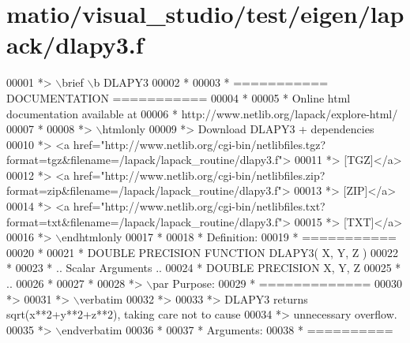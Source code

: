 \hypertarget{matio_2visual__studio_2test_2eigen_2lapack_2dlapy3_8f_source}{}\section{matio/visual\+\_\+studio/test/eigen/lapack/dlapy3.f}
\label{matio_2visual__studio_2test_2eigen_2lapack_2dlapy3_8f_source}

\begin{DoxyCode}
00001 \textcolor{comment}{*> \(\backslash\)brief \(\backslash\)b DLAPY3}
00002 \textcolor{comment}{*}
00003 \textcolor{comment}{*  =========== DOCUMENTATION ===========}
00004 \textcolor{comment}{*}
00005 \textcolor{comment}{* Online html documentation available at }
00006 \textcolor{comment}{*            http://www.netlib.org/lapack/explore-html/ }
00007 \textcolor{comment}{*}
00008 \textcolor{comment}{*> \(\backslash\)htmlonly}
00009 \textcolor{comment}{*> Download DLAPY3 + dependencies }
00010 \textcolor{comment}{*> <a
       href="http://www.netlib.org/cgi-bin/netlibfiles.tgz?format=tgz&filename=/lapack/lapack\_routine/dlapy3.f"> }
00011 \textcolor{comment}{*> [TGZ]</a> }
00012 \textcolor{comment}{*> <a
       href="http://www.netlib.org/cgi-bin/netlibfiles.zip?format=zip&filename=/lapack/lapack\_routine/dlapy3.f"> }
00013 \textcolor{comment}{*> [ZIP]</a> }
00014 \textcolor{comment}{*> <a
       href="http://www.netlib.org/cgi-bin/netlibfiles.txt?format=txt&filename=/lapack/lapack\_routine/dlapy3.f"> }
00015 \textcolor{comment}{*> [TXT]</a>}
00016 \textcolor{comment}{*> \(\backslash\)endhtmlonly }
00017 \textcolor{comment}{*}
00018 \textcolor{comment}{*  Definition:}
00019 \textcolor{comment}{*  ===========}
00020 \textcolor{comment}{*}
00021 \textcolor{comment}{*       DOUBLE PRECISION FUNCTION DLAPY3( X, Y, Z )}
00022 \textcolor{comment}{* }
00023 \textcolor{comment}{*       .. Scalar Arguments ..}
00024 \textcolor{comment}{*       DOUBLE PRECISION   X, Y, Z}
00025 \textcolor{comment}{*       ..}
00026 \textcolor{comment}{*  }
00027 \textcolor{comment}{*}
00028 \textcolor{comment}{*> \(\backslash\)par Purpose:}
00029 \textcolor{comment}{*  =============}
00030 \textcolor{comment}{*>}
00031 \textcolor{comment}{*> \(\backslash\)verbatim}
00032 \textcolor{comment}{*>}
00033 \textcolor{comment}{*> DLAPY3 returns sqrt(x**2+y**2+z**2), taking care not to cause}
00034 \textcolor{comment}{*> unnecessary overflow.}
00035 \textcolor{comment}{*> \(\backslash\)endverbatim}
00036 \textcolor{comment}{*}
00037 \textcolor{comment}{*  Arguments:}
00038 \textcolor{comment}{*  ==========}

\end{DoxyCode}
